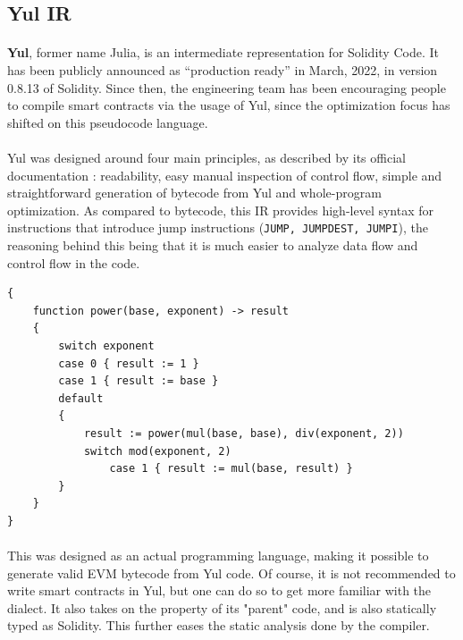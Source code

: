 \subsection*{Yul IR}
\paragraph*{}
\textbf{Yul}, former name Julia, is an intermediate representation for Solidity Code. It has been publicly announced as ``production ready'' in March, 2022, in version 0.8.13 of Solidity. Since then, the engineering team has been encouraging people to compile smart contracts via the usage of Yul, since the optimization focus has shifted on this pseudocode language.

\paragraph*{}
Yul was designed around four main principles, as described by its official documentation \cite{yul-description}: readability, easy manual inspection of control flow, simple and straightforward generation of bytecode from Yul and whole-program optimization. As compared to bytecode, this IR provides high-level syntax for instructions that introduce jump instructions (\lstinline[columns=fixed]{JUMP, JUMPDEST, JUMPI}), the reasoning behind this being that it is much easier to analyze data flow and control flow in the code.

\begin{lstlisting}[caption={Example of Yul code which computes exponentiation recursively}]
{
    function power(base, exponent) -> result
    {
        switch exponent
        case 0 { result := 1 }
        case 1 { result := base }
        default
        {
            result := power(mul(base, base), div(exponent, 2))
            switch mod(exponent, 2)
                case 1 { result := mul(base, result) }
        }
    }
}
\end{lstlisting}

\paragraph*{}
This was designed as an actual programming language, making it possible to generate valid EVM bytecode from Yul code. Of course, it is not recommended to write smart contracts in Yul, but one can do so to get more familiar with the dialect. It also takes on the property of its "parent" code, and is also statically typed as Solidity. This further eases the static analysis done by the compiler.


